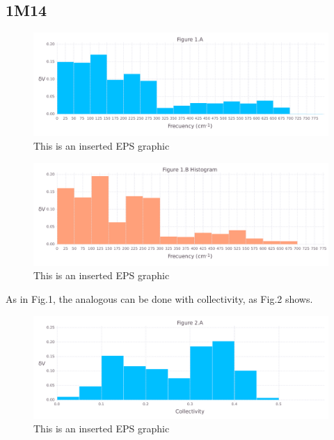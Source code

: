 \documentclass[10pt,letterpaper]{article}
\begin{document}
\FloatBarrier
\newpage

\subsection{1M14}

\begin{figure}[ht]
\begin{center}
\includegraphics[scale=0.5]{1m14/1afigure_hi-precision.pdf}
\caption{This is an inserted EPS graphic}
\label{fig1}
\end{center}
\end{figure}

\begin{figure}[ht]
\begin{center}
\includegraphics[scale=0.5]{1m14/1bfigure_hi-precision.pdf}
\caption{This is an inserted EPS graphic}
\label{fig2}
\end{center}
\end{figure}

\clearpage
As in Fig.1, the analogous can be done with collectivity, as Fig.2 shows.

\begin{figure}[ht]
\begin{center}
\includegraphics[scale=0.5]{1m14/2afigure_hi-precision.pdf}
\caption{This is an inserted EPS graphic}
\label{fig3}
\end{center}
\end{figure}
\end{document}
